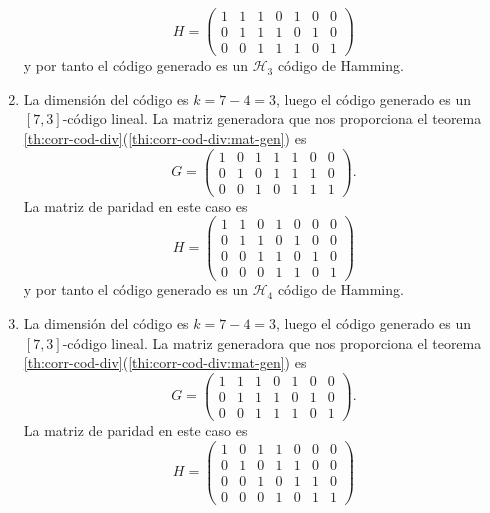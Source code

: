 \begin{example}
\begin{enumerate}
\[      H = \left(\begin{array}{rrrrrrr}
        1 & 1 & 1 & 0 & 1 & 0 & 0 \\
        0 & 1 & 1 & 1 & 0 & 1 & 0 \\
        0 & 0 & 1 & 1 & 1 & 0 & 1
        \end{array}\right)
    \]
    y por tanto el código generado es un \(\mathcal H_3\) código de Hamming.
    \item La dimensión del código es \(k = 7 - 4 = 3\), luego el código generado es un \([7, 3]\)-código lineal.
    La matriz generadora que nos proporciona el teorema \ref{th:corr-cod-div}(\ref{thi:corr-cod-div:mat-gen}) es \[
      G = \left(\begin{array}{rrrrrrr}
        1 & 0 & 1 & 1 & 1 & 0 & 0 \\
        0 & 1 & 0 & 1 & 1 & 1 & 0 \\
        0 & 0 & 1 & 0 & 1 & 1 & 1
        \end{array}\right).
    \]
    La matriz de paridad en este caso es \[
      H = \left(\begin{array}{rrrrrrr}
        1 & 1 & 0 & 1 & 0 & 0 & 0 \\
        0 & 1 & 1 & 0 & 1 & 0 & 0 \\
        0 & 0 & 1 & 1 & 0 & 1 & 0 \\
        0 & 0 & 0 & 1 & 1 & 0 & 1
        \end{array}\right)
    \]
    y por tanto el código generado es un \(\mathcal H_4\) código de Hamming.
    \item La dimensión del código es \(k = 7 - 4 = 3\), luego el código generado es un \([7, 3]\)-código lineal.
    La matriz generadora que nos proporciona el teorema \ref{th:corr-cod-div}(\ref{thi:corr-cod-div:mat-gen}) es \[
      G = \left(\begin{array}{rrrrrrr}
        1 & 1 & 1 & 0 & 1 & 0 & 0 \\
        0 & 1 & 1 & 1 & 0 & 1 & 0 \\
        0 & 0 & 1 & 1 & 1 & 0 & 1
        \end{array}\right).
    \]
    La matriz de paridad en este caso es \[
      H = \left(\begin{array}{rrrrrrr}
        1 & 0 & 1 & 1 & 0 & 0 & 0 \\
        0 & 1 & 0 & 1 & 1 & 0 & 0 \\
        0 & 0 & 1 & 0 & 1 & 1 & 0 \\
        0 & 0 & 0 & 1 & 0 & 1 & 1
        \end{array}\right)
\]
\end{enumerate}
\end{example}
